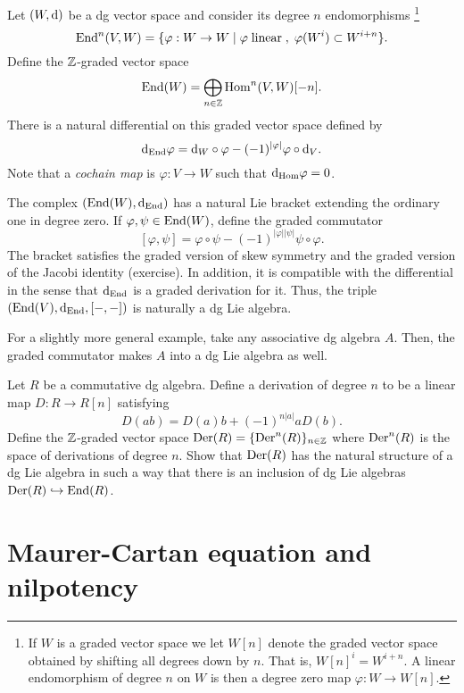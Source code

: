 \documentclass[11pt]{amsart}
\begin{document}
\begin{eg}
Let $(W, {\rm d})$ be a dg vector space and consider its degree $n$ endomorphisms \footnote{If $W$ is a graded vector space we let $W[n]$ denote the graded vector space obtained by shifting all degrees down by $n$.
That is, $W[n]^i = W^{i+n}$. 
A linear endomorphism of degree $n$ on $W$ is then a degree zero map $\varphi : W \to W[n]$.}
\[
{\rm End}^n (V,W) = \{\varphi : W \to W \; | \; \varphi \; {\rm linear} \; , \; \varphi(W^i) \subset W^{i+n} \} .
\]
Define the $\mathbb Z$-graded vector space
\[
{\rm End}(W) = \bigoplus_{n \in \mathbb Z} {\rm Hom}^n(V,W)[-n] .
\] 
There is a natural differential on this graded vector space defined by
\[
{\rm d}_{\rm End} \varphi = {\rm d}_W \circ \varphi -  (-1)^{|\varphi|} \varphi \circ {\rm d}_V .
\]
Note that a {\em cochain map} is $\varphi : V \to W$ such that ${\rm d}_{\rm Hom} \varphi = 0$. 

The complex $({\rm End}(W), {\rm d}_{\rm End})$ has a natural Lie bracket extending the ordinary one in degree zero. 
If $\varphi, \psi \in {\rm End}(W)$, define the graded commutator
\[
[\varphi, \psi] = \varphi \circ \psi - (-1)^{|\varphi| |\psi|} \psi \circ \varphi .
\] 
The bracket satisfies the graded version of skew symmetry and the graded version of the Jacobi identity (exercise). 
In addition, it is compatible with the differential in the sense that ${\rm d}_{{\rm End}}$ is a graded derivation for it. 
Thus, the triple $({\rm End}(V), {\rm d}_{{\rm End}}, [-,-])$ is naturally a dg Lie algebra.
\end{eg}

\begin{eg}
For a slightly more general example, take any associative dg algebra $A$. 
Then, the graded commutator makes $A$ into a dg Lie algebra as well.
\end{eg}

\begin{ex}
Let $R$ be a commutative dg algebra. 
Define a derivation of degree $n$ to be a linear map $D : R \to R[n]$ satisfying
\[
D(ab) = D(a) b + (-1)^{n|a|} a D(b) .
\] 
Define the $\mathbb Z$-graded vector space ${\rm Der}(R) = \{{\rm Der}^n(R)\}_{n \in \mathbb Z}$ where ${\rm Der}^n(R)$ is the space of derivations of degree $n$.
Show that ${\rm Der}(R)$ has the natural structure of a dg Lie algebra in such a way that there is an inclusion of dg Lie algebras ${\rm Der}(R) \hookrightarrow {\rm End}(R)$.
\end{ex}

\section{Maurer-Cartan equation and nilpotency}
\end{document}
